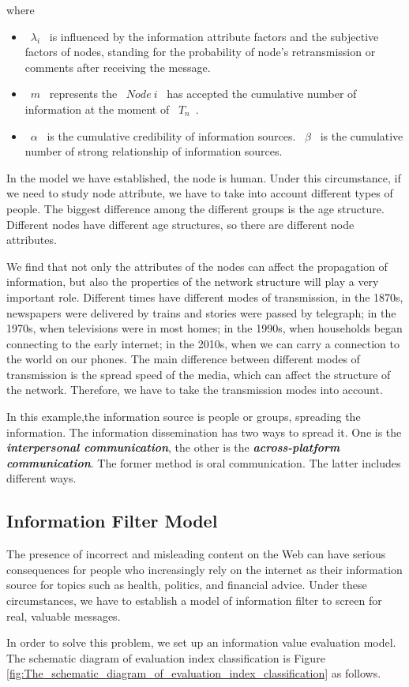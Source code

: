 \documentclass[a4paper,11pt]{article}
\begin{document}
where 
\begin{itemize}
\item ~$\lambda_{i}$~ is influenced by the information attribute factors and the subjective factors of nodes, standing for the probability of node's retransmission or comments after receiving the message.
\item ~$m$~ represents the ~$Node~i$~ has accepted the cumulative number of information at the moment of ~$T_n$~. 
\item ~$\alpha$~ is the cumulative credibility of information sources. ~$\beta$~ is the cumulative number of strong relationship of information sources.
\end{itemize}

\par In the model we have established, the node is human. Under this circumstance, if we need to study node attribute, we have to take into account different types of people. The biggest difference among the different groups is the age structure. Different nodes have different age structures, so there are different node attributes. 



\par We find that not only the attributes of the nodes can affect the propagation of information, but also the properties of the network structure will play a very important role. Different times have different modes of transmission, in the 1870s, newspapers were delivered by trains and stories were passed by telegraph; in the 1970s, when televisions were in most homes; in the 1990s, when households began connecting to the early internet; in the 2010s, when we can carry a connection to the world on our phones. The main difference between different modes of transmission is the spread speed of the media, which can affect the structure of the network. Therefore, we have to take the transmission modes into account. 

\par In this example,the information source is people or groups, spreading the information. The information dissemination has two ways to spread it. One is the \textbf{\emph{interpersonal communication}}, the other is the \textbf{\emph{across-platform communication}}. The former method is oral communication. The latter includes different ways.



\subsection{Information Filter Model}
\par The presence of incorrect and misleading content on the Web can have serious consequences for people who increasingly rely on the internet as their information source for topics such as health, politics, and financial advice\cite{RD}. Under these circumstances, we have to establish a model of information filter to screen for real, valuable messages.
\par In order to solve this problem, we set up an information value evaluation model. The schematic diagram of evaluation index classification is Figure \ref{fig:The_schematic_diagram_of_evaluation_index_classification} as follows.
\end{document}

